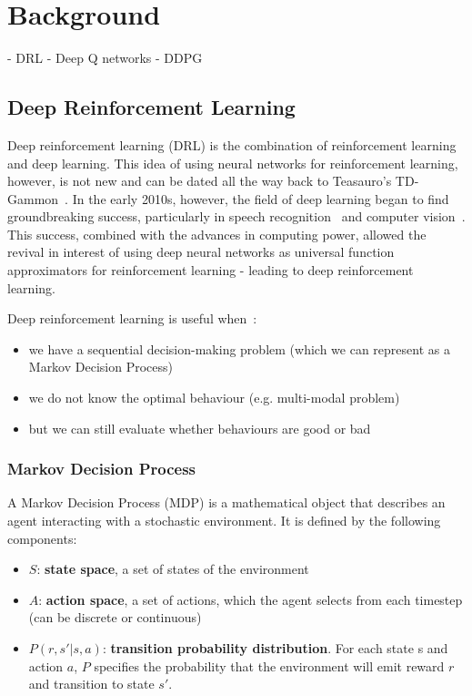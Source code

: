 
\chapter{Background}
\vspace{2em}

- DRL
- Deep Q networks
- DDPG

\section{Deep Reinforcement Learning}

Deep reinforcement learning (DRL) is the combination of reinforcement learning and deep learning. This idea of using neural networks for reinforcement learning, however, is not new and can be dated all the way back to Teasauro's TD-Gammon~\cite{tesauro_temporal_nodate}. In the early 2010s, however, the field of deep learning began to find groundbreaking success, particularly in speech recognition~\cite{dahl_context-dependent_2012} and computer vision~\cite{krizhevsky_imagenet_2017}. This success, combined with the advances in computing power, allowed the revival in interest of using deep neural networks as universal function approximators for reinforcement learning - leading to deep reinforcement learning.

Deep reinforcement learning is useful when~\cite{SpinningUp2018}:
\begin{itemize}
\item we have a sequential decision-making problem (which we can represent as a Markov Decision Process)
\item we do not know the optimal behaviour (e.g. multi-modal problem)
\item but we can still evaluate whether behaviours are good or bad
\end{itemize}

\subsection{Markov Decision Process}
A Markov Decision Process (MDP) is a mathematical object that describes an agent interacting with a stochastic environment. It is defined by the following components:
\begin{itemize}
\item $S$: \textbf{state space}, a set of states of the environment
\item $A$: \textbf{action space}, a set of actions, which the agent selects from each timestep (can be discrete or continuous)
\item $P(r, s' | s, a)$: \textbf{transition probability distribution}. For each state s and action $a$, $P$ specifies the probability that the environment will emit reward $r$ and transition to state $s'$.
\end{itemize}

